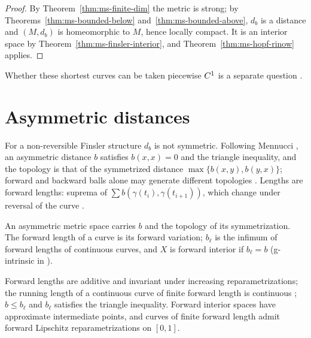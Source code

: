 \begin{proof}
  \leanok
  By Theorem~\ref{thm:ms-finite-dim} the metric is strong; by Theorems~\ref{thm:ms-bounded-below}
  and~\ref{thm:ms-bounded-above}, $d_b$ is a distance and $(M, d_b)$ is homeomorphic to $M$, hence
  locally compact. It is an interior space by Theorem~\ref{thm:ms-finsler-interior}, and
  Theorem~\ref{thm:ms-hopf-rinow} applies.
\end{proof}

Whether these shortest curves can be taken piecewise $C^{1}$ is a separate question
\cite[Obs.~9.1.11]{Lar22}.

\section{Asymmetric distances}
\label{sec:ms-asymmetric}

For a non-reversible Finsler structure $d_b$ is not symmetric. Following Mennucci \cite{Men13},
an asymmetric distance $b$ satisfies $b(x, x) = 0$ and the triangle inequality, and the topology is
that of the symmetrized distance $\max\{b(x, y), b(y, x)\}$; forward and backward balls alone may
generate different topologies \cite[Example~4.1]{Men13}. Lengths are forward lengths: suprema of
$\sum b(\gamma(t_i), \gamma(t_{i+1}))$, which change under reversal of the curve
\cite[Remark~3.5]{Men13}.

\begin{definition}
  \label{def:ms-asymm}
  \leanok
  An asymmetric metric space carries $b$ and the topology of its symmetrization. The forward
  length of a curve is its forward variation; $b_\ell$ is the infimum of forward lengths of
  continuous curves, and $X$ is forward interior if $b_\ell = b$ (g-intrinsic in
  \cite[Def.~3.16]{Men13}).
\end{definition}

\begin{theorem}
  \label{thm:ms-fwd-length}
  \leanok
  Forward lengths are additive and invariant under increasing reparametrizations; the running
  length of a continuous curve of finite forward length is continuous \cite[Prop.~3.9]{Men13};
  $b \leq b_\ell$ and $b_\ell$ satisfies the triangle inequality. Forward interior spaces have
  approximate intermediate points, and curves of finite forward length admit forward Lipschitz
  reparametrizations on $[0, 1]$.
\end{theorem}

